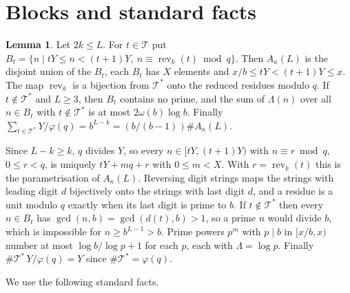 \documentclass[11pt]{amsart}
\makeatletter
\theoremstyle{definition}
\newtheorem{lemma}[theorem]{Lemma}
\numberwithin{equation}{section}
\renewenvironment{proof}[1][\proofname]{\par\pushQED{\qed}\normalfont\topsep6\p@\@plus6\p@\relax\trivlist\item[\hskip\labelsep\upshape#1.]\ignorespaces}{\popQED\endtrivlist\@endpefalse}
\newcommand{\rev}{\operatorname{rev}}
\newcommand{\cT}{\mathcal{T}}
\makeatother
\begin{document}
\section{Blocks and standard facts}\label{sec:setup}

\begin{lemma}\label{lem:blocks}
Let $2k\le L$. For $t\in\cT$ put $B_t=\{n\mid tY\le n<(t+1)Y,\ n\equiv\rev_k(t)\bmod q\}$. Then $A_\kappa(L)$ is the disjoint union of the $B_t$, each $B_t$ has $X$ elements and $x/b\le tY<(t+1)Y\le x$. The map $\rev_k$ is a bijection from $\cT^*$ onto the reduced residues modulo $q$. If $t\notin\cT^*$ and $L\ge3$, then $B_t$ contains no prime, and the sum of $\Lambda(n)$ over all $n\in B_t$ with $t\notin\cT^*$ is at most $2\omega(b)\log b$. Finally $\sum_{t\in\cT^*}Y/\varphi(q)=b^{L-k}=(b/(b-1))\#A_\kappa(L)$.
\end{lemma}

\begin{proof}
Since $L-k\ge k$, $q$ divides $Y$, so every $n\in[tY,(t+1)Y)$ with $n\equiv r\bmod q$, $0\le r<q$, is uniquely $tY+mq+r$ with $0\le m<X$. With $r=\rev_k(t)$ this is the parametrisation of $A_\kappa(L)$. Reversing digit strings maps the strings with leading digit $d$ bijectively onto the strings with last digit $d$, and a residue is a unit modulo $q$ exactly when its last digit is prime to $b$. If $t\notin\cT^*$ then every $n\in B_t$ has $\gcd(n,b)=\gcd(d(t),b)>1$, so a prime $n$ would divide $b$, which is impossible for $n\ge b^{L-1}>b$. Prime powers $p^m$ with $p\mid b$ in $[x/b,x)$ number at most $\log b/\log p+1$ for each $p$, each with $\Lambda=\log p$. Finally $\#\cT^*\,Y/\varphi(q)=Y$ since $\#\cT^*=\varphi(q)$.
\end{proof}

We use the following standard facts.
\end{document}
